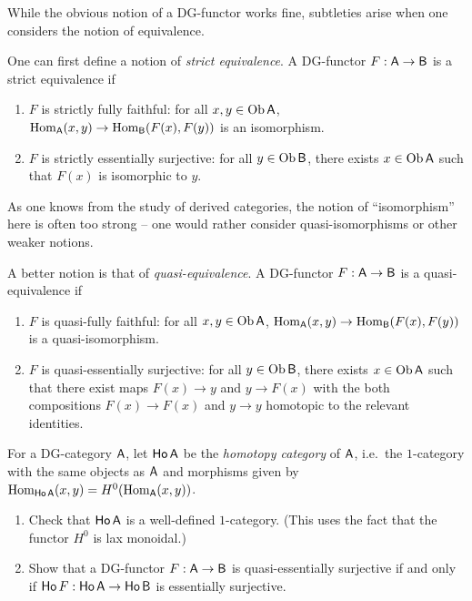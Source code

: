 \documentclass{amsart}
\begin{document}
\begin{rmk}
While the obvious notion of a DG-functor works fine, subtleties arise when one considers the notion of equivalence.

One can first define a notion of \emph{strict equivalence}.
A DG-functor $F: \mathsf{A} \to \mathsf{B}$ is a strict equivalence if
\begin{enumerate}
\item $F$ is strictly fully faithful: for all $x, y \in \operatorname{Ob} \mathsf{A}$, $\operatorname{Hom}_{\mathsf{A}}(x, y) \to \operatorname{Hom}_{\mathsf{B}}(F(x), F(y))$ is an isomorphism.
\item $F$ is strictly essentially surjective: for all $y \in \operatorname{Ob} \mathsf{B}$, there exists $x \in \operatorname{Ob} \mathsf{A}$ such that $F(x)$ is isomorphic to $y$.
\end{enumerate}
As one knows from the study of derived categories, the notion of ``isomorphism'' here is often too strong -- one would rather consider quasi-isomorphisms or other weaker notions.

A better notion is that of \emph{quasi-equivalence}.
A DG-functor $F: \mathsf{A} \to \mathsf{B}$ is a quasi-equivalence if
\begin{enumerate}
	\item $F$ is quasi-fully faithful: for all $x, y \in \operatorname{Ob} \mathsf{A}$, $\operatorname{Hom}_{\mathsf{A}}(x, y) \to \operatorname{Hom}_{\mathsf{B}}(F(x), F(y))$ is a quasi-isomorphism.
	\item $F$ is quasi-essentially surjective: for all $y \in \operatorname{Ob} \mathsf{B}$, there exists $x \in \operatorname{Ob} \mathsf{A}$ such that there exist maps $F(x) \to y$ and $y \to F(x)$ with the both compositions $F(x) \to F(x)$ and $y \to y$ homotopic to the relevant identities.
\end{enumerate}
\end{rmk}

\begin{exer}
For a DG-category $\mathsf{A}$, let $\mathsf{Ho}\, \mathsf{A}$ be the \emph{homotopy category} of $\mathsf{A}$, i.e.\ the $1$-category with the same objects as $\mathsf{A}$ and morphisms given by $\operatorname{Hom}_{\mathsf{Ho}\, \mathsf{A}}(x, y) = H^0(\operatorname{Hom}_{\mathsf{A}}(x, y))$.
\begin{enumerate}
\item Check that $\mathsf{Ho}\, \mathsf{A}$ is a well-defined $1$-category. (This uses the fact that the functor $H^0$ is lax monoidal.)
\item Show that a DG-functor $F: \mathsf{A} \to \mathsf{B}$ is quasi-essentially surjective if and only if $\mathsf{Ho}\, F: \mathsf{Ho}\, \mathsf{A} \to \mathsf{Ho}\, \mathsf{B}$ is essentially surjective.
\end{enumerate}
\end{exer}
\end{document}
